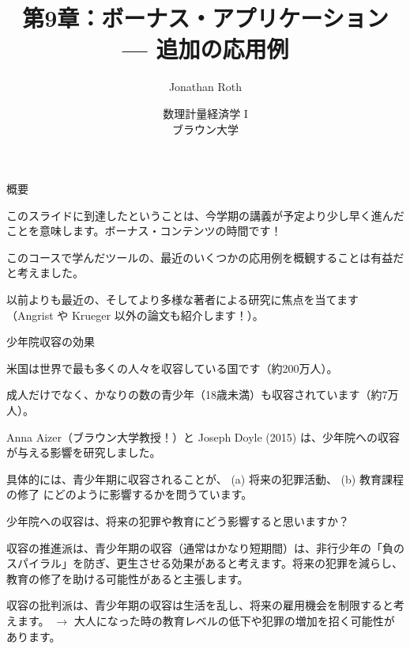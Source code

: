 \documentclass[11pt,handout]{beamer}
\newenvironment{wideitemize}{\itemize\addtolength{\itemsep}{10pt}}{\enditemize}
\begin{document}
	
	\begin{frame}[noframenumbering]{}
		\vspace{0.5cm}
		\title[]{第9章：ボーナス・アプリケーション --- 追加の応用例}
		\author{Jonathan Roth}
		\date{数理計量経済学 I \\ ブラウン大学\\} 
		\titlepage {\small{}\ }\thispagestyle{empty} \vspace{-30pt}
		
	\end{frame}


	\begin{frame}{概要}
		\begin{wideitemize}
			\item
			このスライドに到達したということは、今学期の講義が予定より少し早く進んだことを意味します。ボーナス・コンテンツの時間です！
			
			\item
			このコースで学んだツールの、最近のいくつかの応用例を概観することは有益だと考えました。
			
			\item
			以前よりも最近の、そしてより多様な著者による研究に焦点を当てます（Angrist や Krueger 以外の論文も紹介します！）。
		\end{wideitemize}
	\end{frame}	


	\begin{frame}{少年院収容の効果}
		\begin{wideitemize}
			\item
			米国は世界で最も多くの人々を収容している国です（約200万人）。
			
			\item
			成人だけでなく、かなりの数の青少年（18歳未満）も収容されています（約7万人）。
			
			\item
			Anna Aizer（ブラウン大学教授！）と Joseph Doyle (2015) は、少年院への収容が与える影響を研究しました。
			
			\item
			具体的には、青少年期に収容されることが、 (a) 将来の犯罪活動、 (b) 教育課程の修了 にどのように影響するかを問うています。
			
		\end{wideitemize}
	\end{frame}

\begin{frame}{少年院への収容は、将来の犯罪や教育にどう影響すると思いますか？}
		\begin{wideitemize}	
			\pause
			\item
			収容の推進派は、青少年期の収容（通常はかなり短期間）は、非行少年の「負のスパイラル」を防ぎ、更生させる効果があると考えます。将来の犯罪を減らし、教育の修了を助ける可能性があると主張します。
			
			\item
			収容の批判派は、青少年期の収容は生活を乱し、将来の雇用機会を制限すると考えます。 $\rightarrow$ 大人になった時の教育レベルの低下や犯罪の増加を招く可能性があります。
		\end{wideitemize}
		
\end{frame}
\end{document}
